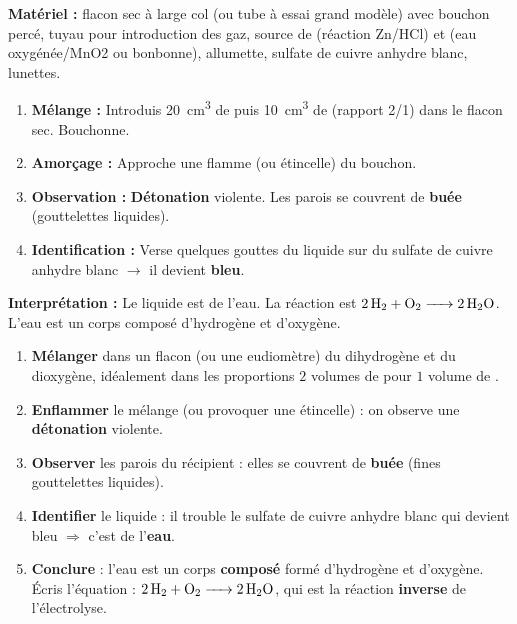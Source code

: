 \documentclass[11pt]{article}
\begin{document}
\begin{experience}
\textbf{Matériel :} flacon sec à large col (ou tube à essai grand modèle) avec bouchon percé, tuyau pour introduction des gaz, source de  (réaction Zn/HCl) et  (eau oxygénée/MnO2 ou bonbonne), allumette, sulfate de cuivre anhydre blanc, lunettes.
\begin{enumerate}
\item \textbf{Mélange :} Introduis \SI{20}{cm^3} de  puis \SI{10}{cm^3} de  (rapport 2/1) dans le flacon sec. Bouchonne.
\item \textbf{Amorçage :} Approche une flamme (ou étincelle) du bouchon.
\item \textbf{Observation :} \textbf{Détonation} violente. Les parois se couvrent de \textbf{buée} (gouttelettes liquides).
\item \textbf{Identification :} Verse quelques gouttes du liquide sur du sulfate de cuivre anhydre blanc $\rightarrow$ il devient \textbf{bleu}.
\end{enumerate}
\textbf{Interprétation :} Le liquide est de l'eau. La réaction est $\ce{2H2 + O2 -> 2H2O}$. L'eau est un corps composé d'hydrogène et d'oxygène.
\end{experience}

\begin{methode}
\begin{enumerate}
\item \textbf{Mélanger} dans un flacon (ou une eudiomètre) du dihydrogène et du dioxygène, idéalement dans les proportions $2$ volumes de  pour $1$ volume de .
\item \textbf{Enflammer} le mélange (ou provoquer une étincelle) : on observe une \textbf{détonation} violente.
\item \textbf{Observer} les parois du récipient : elles se couvrent de \textbf{buée} (fines gouttelettes liquides).
\item \textbf{Identifier} le liquide : il trouble le sulfate de cuivre anhydre blanc qui devient bleu $\Rightarrow$ c'est de l'\textbf{eau}.
\item \textbf{Conclure} : l'eau est un corps \textbf{composé} formé d'hydrogène et d'oxygène. Écris l'équation : $\ce{2H2 + O2 -> 2H2O}$, qui est la réaction \textbf{inverse} de l'électrolyse.
\end{enumerate}
\end{methode}
\end{document}
